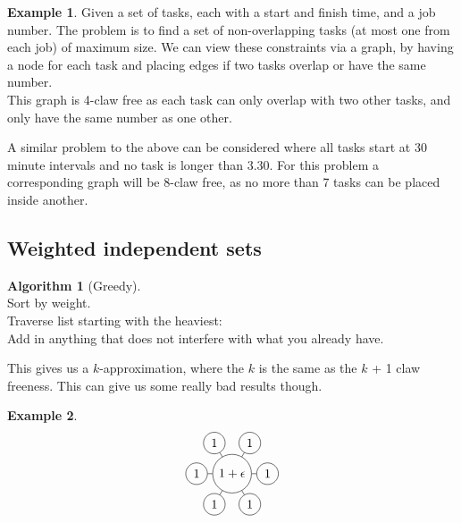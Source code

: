 \documentclass{article}
\theoremstyle{definition}
\newtheorem*{ex}{Example}
\newtheorem*{alg}{Algorithm}
\begin{document}
\begin{ex}
Given a set of tasks, each with a start and finish time, and a job number.
The problem is to find a set of non-overlapping tasks (at most one from each job) of maximum size.
We can view these constraints via a graph, by having a node for each task and placing edges if two tasks overlap or have the same number. \\
This graph is 4-claw free as each task can only overlap with two other tasks, and only have the same number as one other. %
\end{ex}

A similar problem to the above can be considered where all tasks start at 30 minute intervals and no task is longer than 3.30.
For this problem a corresponding graph will be 8-claw free, as no more than 7 tasks can be placed inside another.

\subsection{Weighted independent sets}

\begin{alg}[Greedy]~\\
Sort by weight. \\
Traverse list starting with the heaviest: \\
\indent Add in anything that does not interfere with what you already have.
\end{alg}

This gives us a $k$-approximation, where the $k$ is the same as the $k$ + 1 claw freeness.
This can give us some really bad results though.

\begin{ex}
$$
\begin{tikzpicture}
  \node[draw,circle] (G-1) at (0,0) {$1+\epsilon$};
  \node[draw,circle] (G-2) at (1,0) {1};
  \node[draw,circle] (G-3) at (0.5,0.866) {1};
  \node[draw,circle] (G-4) at (-0.5,0.866) {1};
  \node[draw,circle] (G-5) at (-1,0) {1};
  \node[draw,circle] (G-6) at (-0.5,-0.866) {1};
  \node[draw,circle] (G-7) at (0.5,-0.866) {1};
  \draw (G-1) -- (G-2);
  \draw (G-1) -- (G-3);
  \draw (G-1) -- (G-4);
  \draw (G-1) -- (G-5);
  \draw (G-1) -- (G-6);
  \draw (G-1) -- (G-7);
\end{tikzpicture}
$$
\end{ex}

\end{document}
